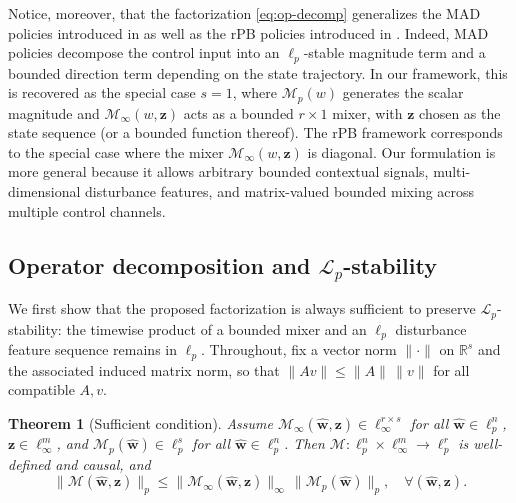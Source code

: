 \documentclass[journal,twoside,web]{ieeecolor}
\newtheorem{theorem}{Theorem}
\newcommand{\disturbance}{\mathbf{\widehat w}}
\newcommand{\operator}{\mathcal{M}}
\begin{document}
Notice, moreover, that the factorization \ref{eq:op-decomp} generalizes the MAD policies introduced in \cite{furieri2025mad} as well as the rPB policies introduced in \cite{11312988}. Indeed, MAD policies
decompose the control input into an \(\ell_p\)-stable magnitude term and a bounded direction term
depending on the state trajectory. In our framework, this is recovered as the special case \(s=1\),
where \(\operator_p(w)\) generates the scalar magnitude and \(\operator_\infty(w,\mathbf z)\) acts as
a bounded \(r\times 1\) mixer, with \(\mathbf z\) chosen as the state sequence (or a bounded function
thereof). The rPB framework corresponds to the special case where the mixer \(\operator_\infty(w,\mathbf z)\) is diagonal. Our formulation is more general because it allows arbitrary bounded contextual signals,
multi-dimensional disturbance features, and matrix-valued bounded mixing across multiple control
channels.


\subsection{Operator decomposition and \texorpdfstring{$\mathcal L_p$}{Lp}-stability}
We first show that the proposed factorization is always sufficient to preserve
\(\mathcal L_p\)-stability: the timewise product of a bounded mixer and an \(\ell_p\) disturbance
feature sequence remains in \(\ell_p\).
Throughout, fix a vector norm \(\|\cdot\|\) on \(\mathbb R^s\) and the associated induced matrix norm,
so that \(\|A v\|\le \|A\|\,\|v\|\) for all compatible \(A,v\).

\begin{theorem}[Sufficient condition]\label{thm:suff}
Assume \(\operator_\infty(\disturbance,\mathbf z)\in \ell_\infty^{r\times s}\) for all
\(\disturbance\in\ell_p^n\), \(\mathbf z\in\ell_\infty^m\), and
\(\operator_p(\disturbance)\in \ell_p^{s}\) for all \(\disturbance\in\ell_p^n\).
Then \(\operator:\ell_p^n\times \ell_\infty^m\to \ell_p^r\) is well-defined and causal, and
\begin{equation}\label{eq:suff-pointwise}
\|\operator(\disturbance,\mathbf z)\|_p
\le
\|\operator_\infty(\disturbance,\mathbf z)\|_\infty\,
\|\operator_p(\disturbance)\|_p,
\quad \forall(\disturbance,\mathbf z).
\end{equation}
\end{theorem}

\smallskip
\end{document}

